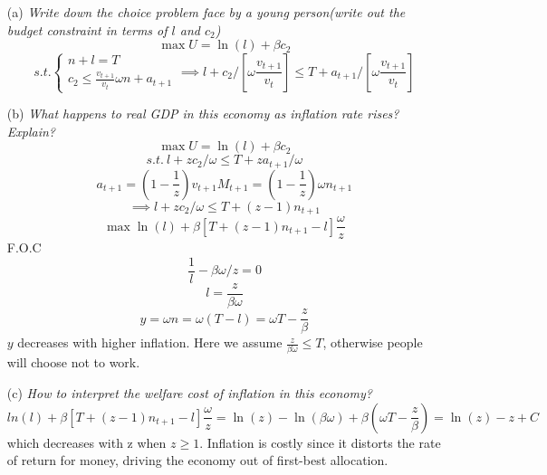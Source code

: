 \documentclass[12pt]{article}
\begin{document}
\begin{itemize}
\item[(a)] \textit{Write down the choice problem face by a young person(write out the budget constraint in terms of $l$ and $c_{2}$)}
\[\max U=\ln (l)+\beta c_{2} \]
\[s.t. \left\{ \begin{aligned} n+l=T \\ c_{2}\leq \frac{v_{t+1}}{v_{t}}\omega n + a_{t+1}\end{aligned} \right. \implies l+c_{2}/[\omega \frac{v_{t+1}}{v_{t}}]\leq T+a_{t+1}/[\omega \frac{v_{t+1}}{v_{t}}]\]
\item[(b)] \textit{What happens to real GDP in this economy as inflation rate rises? Explain?}
\[\max U=\ln (l) +\beta c_{2}\]
\[s.t. \ l+zc_{2}/\omega \leq T +za_{t+1}/\omega\]
\[a_{t+1}=(1-\frac{1}{z})v_{t+1}M_{t+1}=(1-\frac{1}{z})\omega n_{t+1}\]
\[\implies l+zc_{2}/\omega \leq T +(z-1)n_{t+1}\]
\[\max \ln (l) +\beta [T+(z-1)n_{t+1}-l]\frac{\omega}{z}\]
F.O.C \[\frac{1}{l}-\beta\omega/z=0\]
\[l=\frac{z}{\beta \omega}\]
\[y=\omega n=\omega (T-l)=\omega T-\frac{z}{\beta}\]
$y$ decreases with higher inflation. Here we assume $\frac{z}{\beta \omega} \leq T$,  otherwise people will choose not to work.
\item[(c)] \textit{How to interpret the welfare cost of inflation in this economy?}
\[ln(l)+\beta [T+(z-1)n_{t+1}-l]\frac{\omega}{z}=\ln(z)-\ln(\beta \omega)+\beta(\omega T- \frac{z}{\beta})=\ln (z)-z+C\]
which decreases with z when $z \geq 1$. Inflation is costly since it distorts the rate of return for money, driving the economy out of first-best allocation.
\end{itemize}
\end{document}
